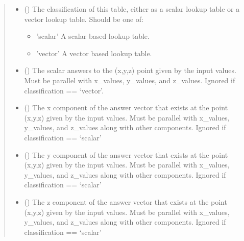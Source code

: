 \documentclass[letterpaper,10pt,english]{sphinxmanual}
\begin{document}
\begin{fulllineitems}
\begin{quote}
\begin{description}
\begin{itemize}
\item {} 
 () \textendash{} 
The classification of this table, either as a scalar lookup table
or a vector lookup table. Should be one of:
\begin{itemize}
\item {} 
’scalar’   A scalar based lookup table.

\item {} 
’vector’   A vector based lookup table.

\end{itemize}


\item {} 
 (\sphinxstyleliteralemphasis{\sphinxupquote{, }}) \textendash{} The scalar answers to the (x,y,z) point given by the input values.
Must be parallel with x\_values, y\_values, and z\_values. Ignored if
classification == ‘vector’.

\item {} 
 (\sphinxstyleliteralemphasis{\sphinxupquote{, }}) \textendash{} The x component of the answer vector that exists at the point
(x,y,z) given by the input values. Must be parallel with x\_values,
y\_values, and z\_values along with other components. Ignored if
classification == ‘scalar’

\item {} 
 (\sphinxstyleliteralemphasis{\sphinxupquote{, }}) \textendash{} The y component of the answer vector that exists at the point
(x,y,z) given by the input values. Must be parallel with x\_values,
y\_values, and z\_values along with other components. Ignored if
classification == ‘scalar’

\item {} 
 (\sphinxstyleliteralemphasis{\sphinxupquote{, }}) \textendash{} The z component of the answer vector that exists at the point
(x,y,z) given by the input values. Must be parallel with x\_values,
y\_values, and z\_values along with other components. Ignored if
classification == ‘scalar’


\end{itemize}
\end{description}
\end{quote}
\end{fulllineitems}
\end{document}
